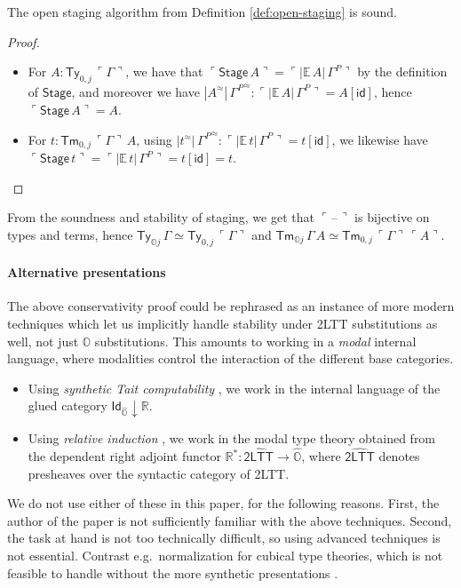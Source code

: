\documentclass[acmsmall,screen]{acmart}
\newcommand{\msf}[1]{\mathsf{#1}}
\newcommand{\mbb}[1]{\mathbb{#1}}
\newcommand{\wh}[1]{\widehat{#1}}
\newcommand{\mbbo}{\mbb{O}}
\newcommand{\Ty}{\msf{Ty}}
\newcommand{\Tm}{\msf{Tm}}
\newcommand{\id}{\msf{id}}
\newcommand{\blank}{{\mathord{\hspace{1pt}\text{--}\hspace{1pt}}}}
\newcommand{\emb}[1]{\ulcorner#1\urcorner}
\newcommand{\Stage}{\msf{Stage}}
\newcommand{\hato}{\bm\hat{\mbbo}}
\newcommand{\ev}{\mbb{E}}
\newcommand{\re}{\mbb{R}}
\theoremstyle{remark}
\newcommand{\rel}{^{\approx}}
\begin{document}
\begin{theorem}
The open staging algorithm from Definition \ref{def:open-staging} is sound.
\end{theorem}
\begin{proof}
\mbox{}
\begin{itemize}
\item For $A : \Ty_{0,j}\,\emb{\Gamma}$, we have that $\emb{\Stage\,A} =
\emb{|\ev\,A|\,\Gamma^P}$ by the definition of $\Stage$, and moreover we have
$|A\rel|\,{\Gamma^P}\rel : \emb{|\ev\,A|\,\Gamma^P} = A[\id]$, hence $\emb{\Stage\,A} = A$.

\item For $t : \Tm_{0,j}\,\emb{\Gamma}\,A$, using $|t\rel|\,{\Gamma^P}\rel : \emb{|\ev\,t|\,\Gamma^P} = t[\id]$, we likewise
  have $\emb{\Stage\,t} = \emb{|\ev\,t|\,\Gamma^P} = t[\id] = t$.
\end{itemize}
\end{proof}

\begin{corollary}\label{conservativity}
From the soundness and stability of staging, we get that $\emb{\blank}$ is
bijective on types and terms, hence $\Ty_{\mbbo j}\,\Gamma \simeq \Ty_{0,j}\,\emb{\Gamma}$ and
$\Tm_{\mbbo j}\,\Gamma\,A \simeq \Tm_{0,j}\,\emb{\Gamma}\,\emb{A}$.
\end{corollary}

\paragraph{Alternative presentations}
The above conservativity proof could be rephrased as an instance of more modern
techniques which let us implicitly handle stability under 2LTT substitutions as
well, not just $\mbbo$ substitutions. This amounts to working in a \emph{modal}
internal language, where modalities control the interaction of the different base
categories.
\begin{itemize}
\item Using \emph{synthetic Tait computability} \cite{sterlingthesis}, we work
      in the internal language of the glued category $\msf{Id}_{\hato}\downarrow
      \re$.
\item Using \emph{relative induction} \cite{bocquet2021relative}, we work in the modal type theory
      obtained from the dependent right adjoint functor $\re^* : \wh{\msf{2LTT}} \to \hato$,
      where $\wh{\msf{2LTT}}$ denotes presheaves over the syntactic category of 2LTT.
\end{itemize}
We do not use either of these in this paper, for the following reasons. First,
the author of the paper is not sufficiently familiar with the above
techniques. Second, the task at hand is not too technically difficult, so using
advanced techniques is not essential. Contrast e.g.\ normalization for cubical
type theories, which is not feasible to handle without the more synthetic
presentations \cite{cubicalnbe}.
\end{document}
